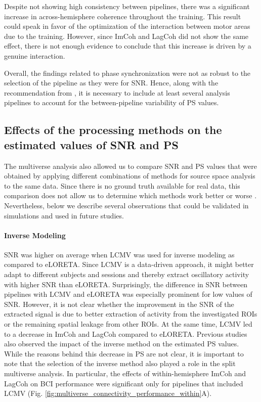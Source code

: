 \medskip

Despite not showing high consistency between pipelines, there was a significant increase in across-hemisphere coherence throughout the training. This result could speak in favor of the optimization of the interaction between motor areas due to the training. However, since ImCoh and LagCoh did not show the same effect, there is not enough evidence to conclude that this increase is driven by a genuine interaction. 

\medskip

Overall, the findings related to phase synchronization were not as robust to the selection of the pipeline as they were for SNR. Hence, along with the recommendation from \cite{Mahjoory2017}, it is necessary to include at least several analysis pipelines to account for the between-pipeline variability of PS values.

\subsection{Effects of the processing methods on the estimated values of SNR and PS}

The multiverse analysis also allowed us to compare SNR and PS values that were obtained by applying different combinations of methods for source space analysis to the same data. Since there is no ground truth available for real data, this comparison does not allow us to determine which methods work better or worse \citep{FeuerriegelBode2022}. Nevertheless, below we describe several observations that could be validated in simulations and used in future studies.

\paragraph{Inverse Modeling} 

SNR was higher on average when LCMV was used for inverse modeling as compared to eLORETA. Since LCMV is a data-driven approach, it might better adapt to different subjects and sessions and thereby extract oscillatory activity with higher SNR than eLORETA. Surprisingly, the difference in SNR between pipelines with LCMV and eLORETA was especially prominent for low values of SNR. However, it is not clear whether the improvement in the SNR of the extracted signal is due to better extraction of activity from the investigated ROIs or the remaining spatial leakage from other ROIs. At the same time, LCMV led to a decrease in ImCoh and LagCoh compared to eLORETA. Previous studies \citep{Mahjoory2017, Pellegrini2023} also observed the impact of the inverse method on the estimated PS values. While the reasons behind this decrease in PS are not clear, it is important to note that the selection of the inverse method also played a role in the split multiverse analysis. In particular, the effects of within-hemisphere ImCoh and LagCoh on BCI performance were significant only for pipelines that included LCMV (Fig. \ref{fig:multiverse_connectivity_performance_within}A).


